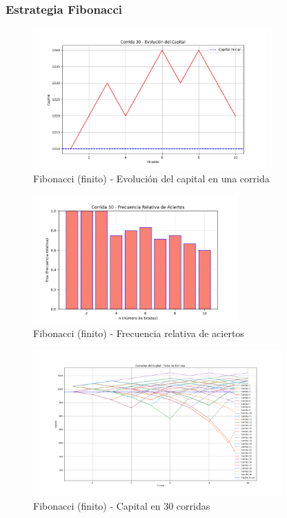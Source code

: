 \documentclass{article}
\begin{document}
\subsubsection*{Estrategia Fibonacci}


\begin{figure}[H]
    \centering
    \includegraphics[width=0.8\textwidth]{./images/capital_corrida_30_f_f.png}
    \caption{Fibonacci (finito) - Evolución del capital en una corrida}
\end{figure}

\begin{figure}[H]
    \centering
    \includegraphics[width=0.7\textwidth]{./images/frsa_corrida_30_f_f.png}
    \caption{Fibonacci (finito) - Frecuencia relativa de aciertos}
\end{figure}

\begin{figure}[H]
    \centering
    \includegraphics[width=0.85\textwidth]{./images/capital_todas_corridas_f_f.png}
    \caption{Fibonacci (finito) - Capital en 30 corridas}
\end{figure}
\end{document}

